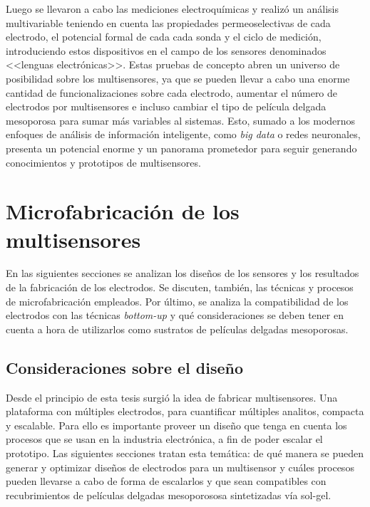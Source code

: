 	Luego se llevaron a cabo las mediciones electroquímicas y realizó un análisis multivariable teniendo en cuenta las propiedades permeoselectivas de cada electrodo, el potencial formal de cada cada sonda y el ciclo de medición, introduciendo estos dispositivos en el campo de los sensores denominados <<lenguas electrónicas>>\cite{mimendia2010,tahara2013}. Estas pruebas de concepto abren un universo de posibilidad sobre los multisensores, ya que se pueden llevar a cabo una enorme cantidad de funcionalizaciones sobre cada electrodo\cite{Jeong2012,Angelome2008,Calvo20210,Herzog2013,walcariussss2001}, aumentar el número de electrodos por multisensores e incluso cambiar el tipo de película delgada mesoporosa para sumar más variables al sistemas. Esto, sumado a los modernos enfoques de análisis de información inteligente, como \textit{big data}\cite{bigdata2013} o redes neuronales\cite{redes2017}, presenta un potencial enorme y un panorama prometedor para seguir generando conocimientos y prototipos de multisensores.
	
\section{Microfabricación de los multisensores}\label{sec:microfabricaci_n_de_los_sensores}
		
	 	 En las siguientes secciones se analizan los diseños de los sensores y los resultados de la fabricación de los electrodos. Se discuten, también, las técnicas y procesos de microfabricación empleados. Por último, se analiza la compatibilidad de los electrodos con las técnicas \textit{bottom-up} y qué consideraciones se deben tener en cuenta a hora de utilizarlos como sustratos de películas delgadas mesoporosas.

	\subsection{Consideraciones sobre el diseño}\label{sec:diseno}

			 Desde el principio de esta tesis surgió la idea de fabricar multisensores. Una plataforma con múltiples electrodos, para cuantificar múltiples analitos, compacta y escalable. Para ello es importante proveer un diseño que tenga en cuenta los procesos que se usan en la industria electrónica, a fin de poder escalar el prototipo. Las siguientes secciones tratan esta temática: de qué manera se pueden generar y optimizar diseños de electrodos para un multisensor y cuáles procesos pueden llevarse a cabo de forma de escalarlos y que sean compatibles con recubrimientos de películas delgadas mesoporososa sintetizadas vía sol-gel.

